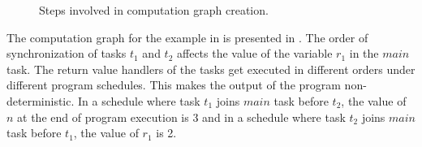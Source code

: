 \begin{figure}
\begin{center}
  \caption{Steps involved in computation graph creation.}
  \vspace{-1em}
   \label{fig:cgcreation}
   \end{center}
\end{figure}

The computation graph for the example in  is presented in . The order of synchronization of tasks $t_1$ and $t_2$ affects the value of the variable $r_1$ in the $main$ task. The return value handlers of the tasks get executed in different orders under different program schedules. This makes the output of the program non-deterministic. In a schedule where task $t_1$ joins $main$ task before $t_2$, the value of $n$ at the end of program execution is 3 and in a schedule where task $t_2$ joins $main$ task before $t_1$, the value of $r_1$ is 2.

